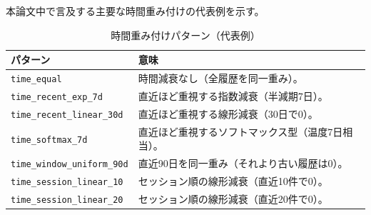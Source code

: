 本論文中で言及する主要な時間重み付けの代表例を示す。
\begin{table}[htbp]
\centering
\caption{時間重み付けパターン（代表例）}
\label{tab:time-weighting-core}
\scriptsize
\begin{tabularx}{\linewidth}{l X}
\hline
パターン & 意味 \\
\hline
\texttt{time\_equal} & 時間減衰なし（全履歴を同一重み）。 \\
\texttt{time\_recent\_exp\_7d} & 直近ほど重視する指数減衰（半減期7日）。 \\
\texttt{time\_recent\_linear\_30d} & 直近ほど重視する線形減衰（30日で0）。 \\
\texttt{time\_softmax\_7d} & 直近ほど重視するソフトマックス型（温度7日相当）。 \\
\texttt{time\_window\_uniform\_90d} & 直近90日を同一重み（それより古い履歴は0）。 \\
\texttt{time\_session\_linear\_10} & セッション順の線形減衰（直近10件で0）。 \\
\texttt{time\_session\_linear\_20} & セッション順の線形減衰（直近20件で0）。 \\
\hline
\end{tabularx}
\end{table}

